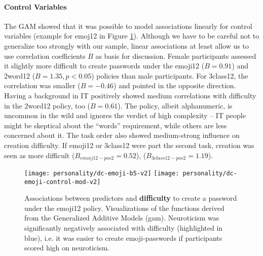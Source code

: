 \paragraph{Control Variables} 
The GAM showed that it was possible to model associations linearly for control variables (example for emoj12 in Figure \ref{fig:personality:dc-emoji-b5}). Although we have to be careful not to generalize too strongly with our sample, linear associations at least allow us to use correlation coefficients $B$ as basis for discussion.
Female participants assessed it slightly more difficult to create passwords under the emoji12 ($B=0.91$) and 2word12 ($B=1.35, p<0.05$) policies than male participants. For 3class12, the correlation was smaller ($B=-0.46$) and pointed in the opposite direction. 
Having a background in IT positively showed medium correlations with difficulty in the 2word12 policy, too ($B=0.61$). The policy, albeit alphanumeric, is uncommon in the wild and ignores the verdict of high complexity -- IT people might be skeptical about the ``words'' requirement, while others are less concerned about it.
The task order also showed medium-strong influence on creation difficulty. If emoji12 or 3class12 were part the second task, creation was seen as more difficult ($B_{emoij12-pos2}=0.52$),  ($B_{3class12-pos2}=1.19$). 


\begin{figure}
\texttt{[image: personality/dc-emoji-b5-v2]}
\texttt{[image: personality/dc-emoji-control-mod-v2]}
\caption{\label{fig:personality:dc-emoji-b5}Associations between predictors and \textbf{difficulty} to create a password under the emoji12 policy. Visualizations of the functions derived from the Generalized Additive Models (gam). Neuroticism was significantly negatively associated with difficulty (highlighted in blue), i.e. it was easier to create emoji-passwords if participants scored high on neuroticism.}
\end{figure}

